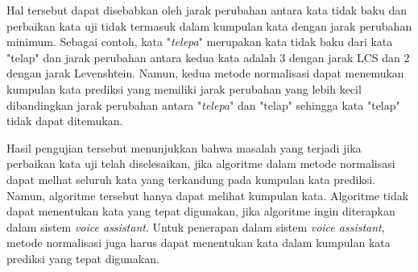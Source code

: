 Hal tersebut dapat disebabkan oleh jarak perubahan antara kata tidak baku dan perbaikan kata uji tidak termasuk dalam kumpulan kata dengan  jarak perubahan minimum. Sebagai contoh, kata "\textit{telepa}" merupakan kata tidak baku dari kata "telap" dan jarak perubahan antara kedua kata adalah 3 dengan jarak LCS dan 2 dengan jarak Levenshtein. Namun, kedua metode normalisasi dapat menemukan kumpulan kata prediksi yang memiliki jarak perubahan yang lebih kecil dibandingkan jarak perubahan antara "\textit{telepa}" dan "telap" sehingga kata "telap" tidak dapat ditemukan.

Hasil pengujian tersebut menunjukkan bahwa masalah yang terjadi jika perbaikan kata uji telah diselesaikan, jika algoritme dalam metode normalisasi dapat melhat seluruh kata yang terkandung pada kumpulan kata prediksi. Namun, algoritme tersebut hanya dapat melihat kumpulan kata. Algoritme tidak dapat menentukan kata yang tepat digunakan, jika algoritme ingin diterapkan dalam sistem \textit{voice assistant}. Untuk penerapan dalam sistem \textit{voice assistant}, metode normalisasi juga harus dapat menentukan kata dalam kumpulan kata prediksi yang tepat digunakan.